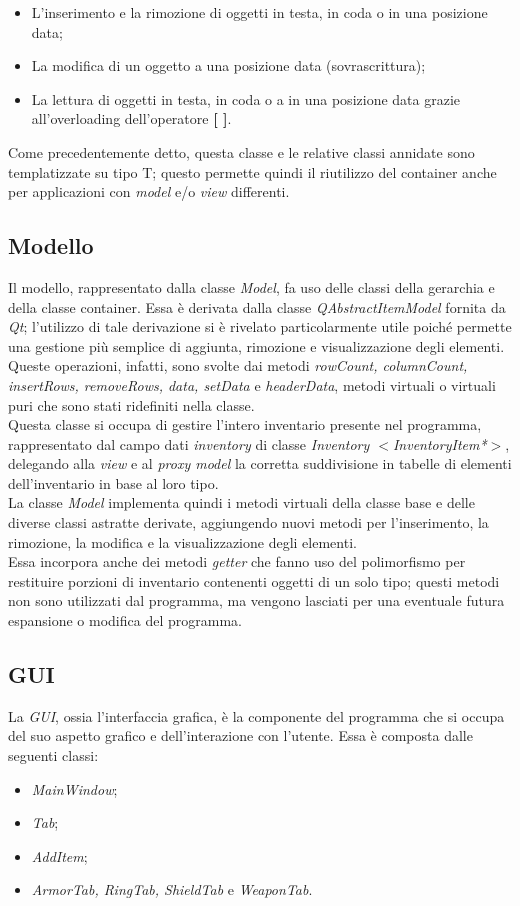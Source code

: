 \begin{itemize}
  \item L'inserimento e la rimozione di oggetti in testa, in coda o in una posizione data;
  \item La modifica di un oggetto a una posizione data (sovrascrittura);
  \item La lettura di oggetti in testa, in coda o a in una posizione data grazie all'overloading dell'operatore \textbf{[ ]}.
\end{itemize}
Come precedentemente detto, questa classe e le relative classi annidate sono templatizzate su tipo T; questo permette quindi il riutilizzo del container anche per applicazioni con \textit{model} e/o \textit{view} differenti.

\subsection{Modello}
Il modello, rappresentato dalla classe \textit{Model}, fa uso delle classi della gerarchia e della classe container. Essa è derivata dalla classe \textit{QAbstractItemModel} fornita da \textit{Qt}; l'utilizzo di tale derivazione si è rivelato particolarmente utile poiché permette una gestione più semplice di aggiunta, rimozione e visualizzazione degli elementi. Queste operazioni, infatti, sono svolte dai metodi \textit{rowCount, columnCount, insertRows, removeRows, data, setData} e \textit{headerData}, metodi virtuali o virtuali puri che sono stati ridefiniti nella classe. \\
Questa classe si occupa di gestire l'intero inventario presente nel programma, rappresentato dal campo dati \textit{inventory} di classe \textit{Inventory $<$InventoryItem*$>$}, delegando alla \textit{view} e al \textit{proxy model} la corretta suddivisione in tabelle di elementi dell'inventario in base al loro tipo. \\
La classe \textit{Model} implementa quindi i metodi virtuali della classe base e delle diverse classi astratte derivate, aggiungendo nuovi metodi per l'inserimento, la rimozione, la modifica e la visualizzazione degli elementi. \\
Essa incorpora anche dei metodi \textit{getter} che fanno uso del polimorfismo per restituire porzioni di inventario contenenti oggetti di un solo tipo; questi metodi non sono utilizzati dal programma, ma vengono lasciati per una eventuale futura espansione o modifica del programma.

\subsection{GUI}
La \textit{GUI}, ossia l'interfaccia grafica, è la componente del programma che si occupa del suo aspetto grafico e dell'interazione con l'utente. Essa è composta dalle seguenti classi:
\begin{itemize}
  \item \textit{MainWindow};
  \item \textit{Tab};
  \item \textit{AddItem};
  \item \textit{ArmorTab, RingTab, ShieldTab} e \textit{WeaponTab}.
\end{itemize}

